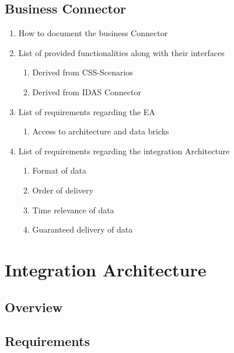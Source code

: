 \documentclass[
     12pt,         %
     a4paper,      %
     BCOR10mm,     %
     DIV14,        %
     ]{scrreprt}
\begin{document}
\section{Business Connector}
\begin{enumerate}
     \item How to document the business Connector
     \item List of provided functionalities along with their interfaces
           \begin{enumerate}
                \item Derived from CSS-Scenarios
                \item Derived from IDAS Connector
           \end{enumerate}

     \item List of requirements regarding the EA
           \begin{enumerate}
                \item Access to architecture and data bricks
           \end{enumerate}

     \item List of requirements regarding the integration Architecture
           \begin{enumerate}
                \item Format of data
                \item Order of delivery
                \item Time relevance of data
                \item Guaranteed delivery of data
           \end{enumerate}

\end{enumerate}

\newpage

\chapter{Integration Architecture}

\section{Overview}

\section{Requirements}
\end{document}

